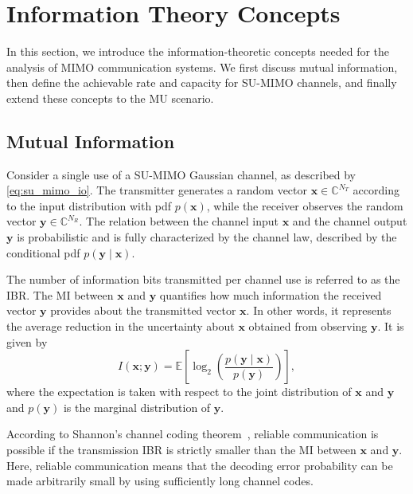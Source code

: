 \section{Information Theory Concepts}

In this section, we introduce the information-theoretic concepts needed for the analysis of \ac{MIMO} communication systems. We first discuss mutual information, then define the achievable rate and capacity for \ac{SU}-\ac{MIMO} channels, and finally extend these concepts to the \ac{MU} scenario.

\subsection{Mutual Information}

Consider a single use of a \ac{SU}-\ac{MIMO} Gaussian channel, as described by \eqref{eq:su_mimo_io}.
The transmitter generates a random vector $\mathbf{x} \in \mathbb{C}^{N_T}$ according to the input distribution with \ac{pdf} $p(\mathbf{x})$, while the receiver observes the random vector $\mathbf{y} \in \mathbb{C}^{N_R}$.
The relation between the channel input $\mathbf{x}$ and the channel output $\mathbf{y}$ is probabilistic and is fully characterized by the channel law, described by the conditional \ac{pdf} $p(\mathbf{y} \mid \mathbf{x})$.

The number of information bits transmitted per channel use is referred to as the \ac{IBR}.
The \ac{MI} between $\mathbf{x}$ and $\mathbf{y}$ quantifies how much information the received vector $\mathbf{y}$ provides about the transmitted vector $\mathbf{x}$.
In other words, it represents the average reduction in the uncertainty about $\mathbf{x}$ obtained from observing $\mathbf{y}$. It is given by
\begin{equation}
    I(\mathbf{x};\mathbf{y})
    = \mathbb{E}\!\left[ \log_2\!\left( \frac{p(\mathbf{y}\mid\mathbf{x})}{p(\mathbf{y})} \right) \right],
\label{eq:mutual_information_su}
\end{equation}
where the expectation is taken with respect to the joint distribution of $\mathbf{x}$ and $\mathbf{y}$ and $p(\mathbf{y})$ is the marginal distribution of $\mathbf{y}$.

According to Shannon's channel coding theorem~\cite{shannon_1948}, reliable communication is possible if the transmission \ac{IBR} is strictly smaller than the \ac{MI} between $\mathbf{x}$ and $\mathbf{y}$.
Here, reliable communication means that the decoding error probability can be made arbitrarily small by using sufficiently long channel codes.

